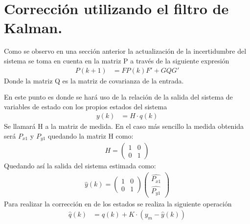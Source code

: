 \section{Corrección utilizando el filtro de Kalman.}
Como se observo en una sección anterior la actualización de la incertidumbre del sistema se toma en cuenta en la matriz P a través de la siguiente expresión 
\begin{equation*}
\left.
 \begin{aligned}
P(k+1)&=FP(k)F'+GQG'
\end{aligned}
\right.
\end{equation*}
Donde la matriz Q es la matriz de covarianza de la entrada.
\par
En este punto es donde se hará uso de la relación de la salida del sistema de variables de estado con los propios estados del sistema 
\begin{equation*}
\left.
 \begin{aligned}
y(k)&=H\cdot{q(k)}
\end{aligned}
\right.
\end{equation*}
Se llamará H a la matriz de medida. En el caso más sencillo la medida obtenida será $P_{x1}$ y $P_{y1}$ quedando la matriz H como:
\begin{equation*}
\left.
 \begin{aligned}
H=\begin{pmatrix}
1 & 0\\
0 & 1 
\end{pmatrix}
\end{aligned}
\right.
\end{equation*}
Quedando así la salida del sistema estimada como:
\begin{equation*}
\left.
 \begin{aligned}
\hat{y}(k)=\begin{pmatrix}
1 & 0\\
0 & 1 
\end{pmatrix}\begin{pmatrix}
\hat{P_{x1}}\\
\hat{P_{y1}} 
\end{pmatrix}
\end{aligned}
\right.
\end{equation*}
Para realizar la corrección en de los estados se realiza la siguiente operación 
\begin{equation*}
\left.
 \begin{aligned}
\hat{q}(k)&=\hat{q}(k)+K\cdot{(y_{m}-\hat{y}(k))}
\end{aligned}
\right.
\end{equation*}
